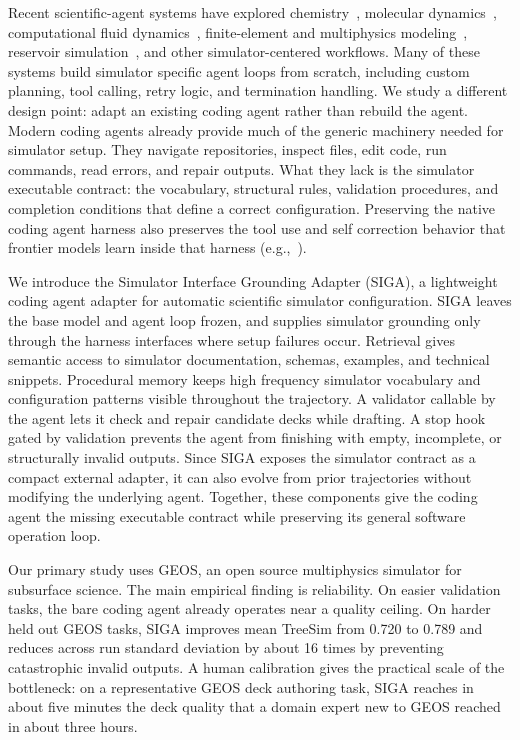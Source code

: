 \documentclass{article}
\begin{document}
Recent scientific-agent systems have explored chemistry~\citep{bran2024chemcrow,boiko2023coscientist}, molecular dynamics~\citep{shi2026mdagent2,zhao2026polyjarvis,guilbert2025dynamate}, computational fluid dynamics~\citep{chen2024metaopenfoam,yue2025foamagent,pandey2025openfoamgpt}, finite-element and multiphysics modeling~\citep{zhan2025mooseagent,mcpsim2026,ni2024mechagents}, reservoir simulation~\citep{moyner2026jutulgpt}, and other simulator-centered workflows. Many of these systems build simulator specific agent loops from scratch, including custom planning, tool calling, retry logic, and termination handling. We study a different design point: adapt an existing coding agent rather than rebuild the agent. Modern coding agents already provide much of the generic machinery needed for simulator setup. They navigate repositories, inspect files, edit code, run commands, read errors, and repair outputs. What they lack is the simulator executable contract: the vocabulary, structural rules, validation procedures, and completion conditions that define a correct configuration. Preserving the native coding agent harness also preserves the tool use and self correction behavior that frontier models learn inside that harness (e.g.,~\citealp{cursor2026composer2}).

We introduce the Simulator Interface Grounding Adapter (SIGA), a lightweight coding agent adapter for automatic scientific simulator configuration. SIGA leaves the base model and agent loop frozen, and supplies simulator grounding only through the harness interfaces where setup failures occur. Retrieval gives semantic access to simulator documentation, schemas, examples, and technical snippets. Procedural memory keeps high frequency simulator vocabulary and configuration patterns visible throughout the trajectory. A validator callable by the agent lets it check and repair candidate decks while drafting. A stop hook gated by validation prevents the agent from finishing with empty, incomplete, or structurally invalid outputs. Since SIGA exposes the simulator contract as a compact external adapter, it can also evolve from prior trajectories without modifying the underlying agent. Together, these components give the coding agent the missing executable contract while preserving its general software operation loop.

Our primary study uses GEOS, an open source multiphysics simulator for subsurface science. The main empirical finding is reliability. On easier validation tasks, the bare coding agent already operates near a quality ceiling. On harder held out GEOS tasks, SIGA improves mean TreeSim from 0.720 to 0.789 and reduces across run standard deviation by about 16 times by preventing catastrophic invalid outputs. A human calibration gives the practical scale of the bottleneck: on a representative GEOS deck authoring task, SIGA reaches in about five minutes the deck quality that a domain expert new to GEOS reached in about three hours.
\end{document}
